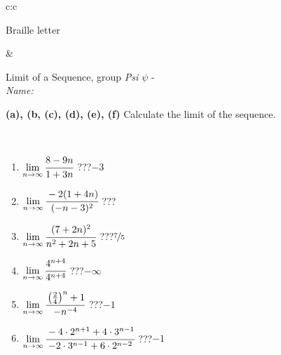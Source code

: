 \documentclass[10pt]{report}
\begin{document}
\begin{tabular}{c:c}
\begin{minipage}[c][104.5mm][t]{0.5\linewidth}
\begin{center}
\begin{minipage}{0.20\linewidth}
\begin{center}
{\small Braille letter}
\end{center}
\end{minipage}
\end{center}
\end{minipage}
&
\begin{minipage}[c][104.5mm][t]{0.5\linewidth}
\begin{center}
\vspace{5mm}
{\huge Limit of a Sequence, group \textit{Psi $\psi$} -}\\[5mm]
\textit{Name:}\phantom{xxxxxxxxxxxxxxxxxxxxxxxxxxxxxxxxxxxxxxxxxxxxxxxxxxxxxxxxxxxxxxxxx}\\[5mm]
\begin{minipage}{0.95\linewidth}
\begin{center}
{
\textbf{(a), (b, (c), (d), (e), (f)} Calculate the limit of the sequence. \\[-1mm]
\phantom{x}
}
\end{center}
\end{minipage}
\\[1mm]
\begin{minipage}{0.79\linewidth}
\begin{center}
\begin{varwidth}{\linewidth}
\setlength{\itemsep}{0pt}
\begin{enumerate}
\normalsize
\item $\lim\limits_{n\to\infty}\cfrac{8-9n}{1+3n}$\quad \dotfill\; ???\;\dotfill \quad $-3$
\item $\lim\limits_{n\to\infty}\cfrac{-2(1+4n)}{(-n-3)^2}$\quad \dotfill\; ???\;\dotfill {}
\item $\lim\limits_{n\to\infty}\cfrac{(7+2n)^2}{n^2+2n+5}$\quad \dotfill\; ???\;\dotfill \quad $\nicefrac{7}{5}$
\item $\lim\limits_{n\to\infty}\cfrac{4^{n+4}}{4^{n+4}}$\quad \dotfill\; ???\;\dotfill \quad $-\infty$
\item $\lim\limits_{n\to\infty}\cfrac{\left(\frac{2}{4}\right)^n +1}{-n^{-4}}$\quad \dotfill\; ???\;\dotfill \quad $-1$
\item $\lim\limits_{n\to\infty}\cfrac{-4\cdot 2^{n+1}+4\cdot 3^{n-1}}{-2\cdot 3^{n-1}+6\cdot 2^{n-2}}$\quad \dotfill\; ???\;\dotfill \quad $-1$
\end{enumerate}
\end{varwidth}
\end{center}
\end{minipage}
\begin{minipage}{0.20\linewidth}

\end{minipage}
\end{center}
\end{minipage}
\end{tabular}
\end{document}
